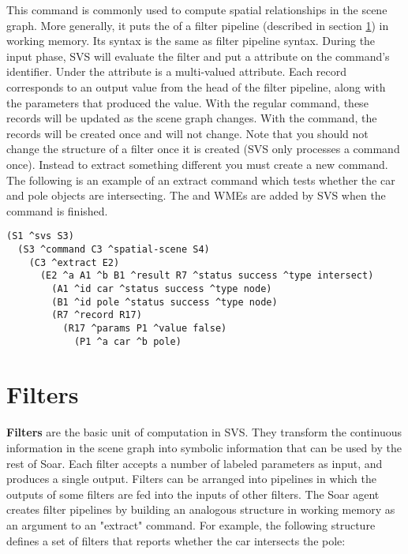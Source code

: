 This command is commonly used to compute spatial relationships in the scene graph.
More generally, it puts the  of a filter pipeline (described in section \ref{sec:svs-filters}) in working memory.
Its syntax is the same as filter pipeline syntax.
During the input phase, SVS will evaluate the filter and 
put a  attribute on the command's identifier.
Under the  attribute is a multi-valued  attribute.
Each record corresponds to an output value from the head of the filter pipeline, along with the parameters that produced the value.
With the regular  command, these records will be updated as the scene graph
changes. With the  command, the records will be created once
and will not change. 
Note that you should not change the structure of a filter once it is created 
(SVS only processes a command once). 
Instead to extract something different you must create a new command. 
The following is an example of an extract command which tests whether the 
car and pole objects are intersecting. The  and  WMEs are 
added by SVS when the command is finished. 

\begin{verbatim}
(S1 ^svs S3)
  (S3 ^command C3 ^spatial-scene S4)
    (C3 ^extract E2)
      (E2 ^a A1 ^b B1 ^result R7 ^status success ^type intersect)
        (A1 ^id car ^status success ^type node)
        (B1 ^id pole ^status success ^type node)
        (R7 ^record R17)
          (R17 ^params P1 ^value false)
            (P1 ^a car ^b pole)
\end{verbatim}


\section{Filters}
\label{sec:svs-filters}

\textbf{Filters} are the basic unit of computation in SVS.
They transform the continuous information in the scene graph into symbolic information that can be used by the rest of Soar.
Each filter accepts a number of labeled parameters as input, and produces a single output.
Filters can be arranged into pipelines in which the outputs of some filters are fed into the inputs of other filters.
The Soar agent creates filter pipelines by building an analogous structure in working memory as an argument to an "extract" command.
For example, the following structure defines a set of filters that reports whether the car intersects the pole:

